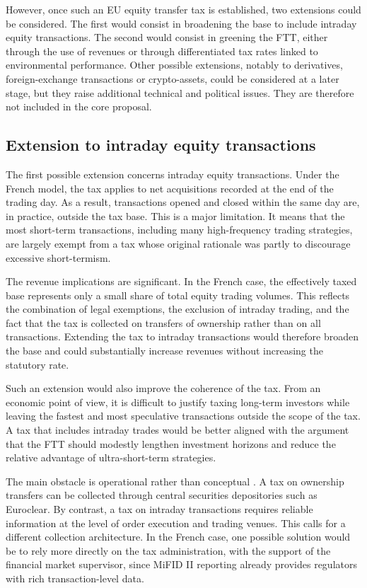 \documentclass[../main]{subfiles}
\begin{document}
However, once such an EU equity transfer tax is established, two extensions could be considered. The first would consist in broadening the base to include intraday equity transactions. The second would consist in greening the FTT, either through the use of revenues or through differentiated tax rates linked to environmental performance. Other possible extensions, notably to derivatives, foreign-exchange transactions or crypto-assets, could be considered at a later stage, but they raise additional technical and political issues. They are therefore not included in the core proposal.

\subsection{Extension to intraday equity transactions}

The first possible extension concerns intraday equity transactions. Under the French model, the tax applies to net acquisitions recorded at the end of the trading day. As a result, transactions opened and closed within the same day are, in practice, outside the tax base. This is a major limitation. It means that the most short-term transactions, including many high-frequency trading strategies, are largely exempt from a tax whose original rationale was partly to discourage excessive short-termism.

The revenue implications are significant. In the French case, the effectively taxed base represents only a small share of total equity trading volumes. This reflects the combination of legal exemptions, the exclusion of intraday trading, and the fact that the tax is collected on transfers of ownership rather than on all transactions. Extending the tax to intraday transactions would therefore broaden the base and could substantially increase revenues without increasing the statutory rate.

Such an extension would also improve the coherence of the tax. From an economic point of view, it is difficult to justify taxing long-term investors while leaving the fastest and most speculative transactions outside the scope of the tax. A tax that includes intraday trades would be better aligned with the argument that the FTT should modestly lengthen investment horizons and reduce the relative advantage of ultra-short-term strategies.

The main obstacle is operational rather than conceptual \citep{ CapelleBlancard2024FrenchFTT}. A tax on ownership transfers can be collected through central securities depositories such as Euroclear. By contrast, a tax on intraday transactions requires reliable information at the level of order execution and trading venues. This calls for a different collection architecture. In the French case, one possible solution would be to rely more directly on the tax administration, with the support of the financial market supervisor, since MiFID II reporting already provides regulators with rich transaction-level data.
\end{document}
